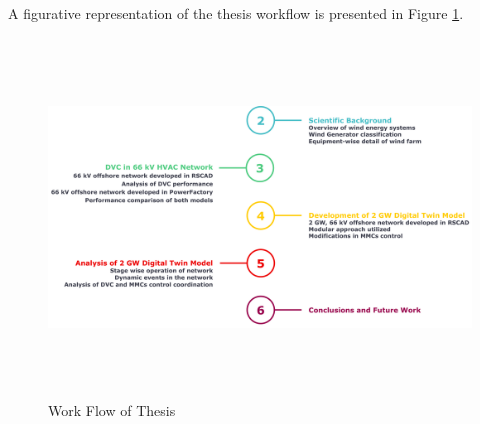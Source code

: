 A figurative representation of the thesis workflow is presented in Figure \ref{fig:Thesis_outline}.

\begin{figure}[H]
\centering
    \includegraphics[height = 9.5cm,width =\textwidth]{Diagrams/Chapter_1/Thesis_flowchart.pdf}
    \caption{Work Flow of Thesis}
    \label{fig:Thesis_outline}
\end{figure}
